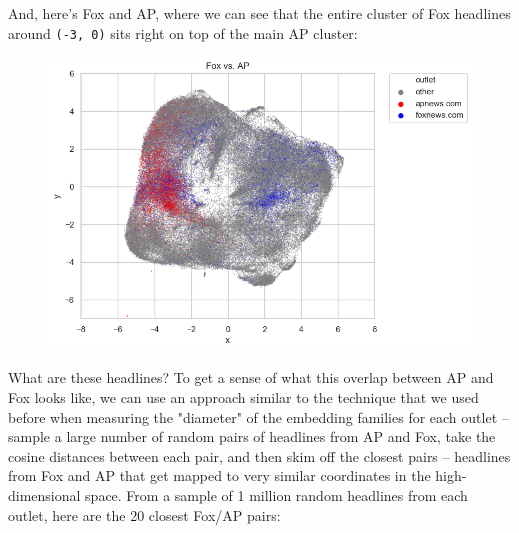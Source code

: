 \documentclass{scrartcl}
\begin{document}
And, here's Fox and AP, where we can see that the entire cluster of Fox headlines around \texttt{(-3, 0)} sits right on top of the main AP cluster:

\begin{figure}[H]
  \centering
  \includegraphics[height=0.4\textheight]{figures/fox-ap-umap.png}
\end{figure}

What are these headlines? To get a sense of what this overlap between AP and Fox looks like, we can use an approach similar to the technique that we used before when measuring the "diameter" of the embedding families for each outlet -- sample a large number of random pairs of headlines from AP and Fox, take the cosine distances between each pair, and then skim off the closest pairs -- headlines from Fox and AP that get mapped to very similar coordinates in the high-dimensional space. From a sample of 1 million random headlines from each outlet, here are the 20 closest Fox/AP pairs:
\end{document}
